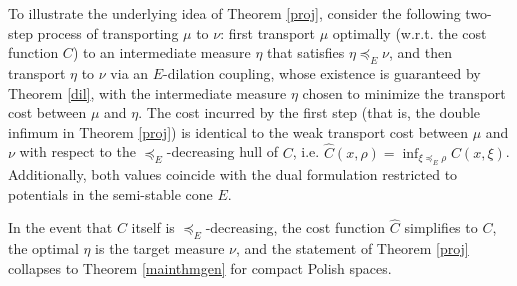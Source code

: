 \documentclass[reqno, a4paper]{amsart}
\newcommand{\ld}{\preceq_{E}}
\newtheorem{theorem}{Theorem}[section]
\newcommand{\PP}{\mathcal{P}}
\newcommand{\cP}{\mathcal{P}}
\renewcommand{\P}{\cP}
\theoremstyle{definition}
\theoremstyle{definition}
\theoremstyle{definition}
\begin{document}
    To illustrate the underlying idea of Theorem \ref{proj}, consider the following two-step process of transporting $\mu$ to $\nu$: first transport $\mu$ optimally (w.r.t. the cost function $C$)  to an intermediate measure $\eta$ that satisfies $\eta\ld\nu$, and then transport $\eta$ to $\nu$ via an $E$-dilation coupling, whose existence is guaranteed by Theorem \ref{dil}, with the intermediate measure $\eta$ chosen to minimize the transport cost between $\mu$ and $\eta$. The cost incurred by the first step (that is, the double infimum in Theorem \ref{proj}) is identical to the weak transport cost between $\mu$ and $\nu$ with respect to the $\ld$-decreasing hull of $C$, i.e. $\widehat{C}(x,\rho)=\inf_{\xi\ld\rho} C(x,\xi)$. Additionally, both values coincide with the dual formulation restricted to potentials in the semi-stable cone $E$.

    In the event that $C$ itself is $\ld$-decreasing, the cost function $\widehat{C}$ simplifies to $C$, the optimal $\eta$ is the target measure $\nu$, and the statement of Theorem \ref{proj} collapses to Theorem \ref{mainthmgen} for compact Polish spaces.







\end{document}
